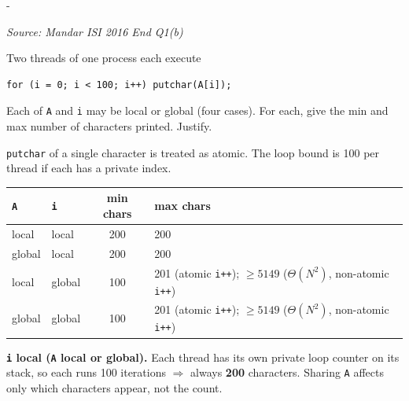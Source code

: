 \documentclass[11pt,a4paper]{article}
\makeatletter
\newcommand{\keepspace}[1]{\par\penalty-100\begingroup
  \setlength{\dimen@}{#1}\dimen@ii\pagegoal\advance\dimen@ii-\pagetotal
  \ifdim\dimen@>\dimen@ii\ifdim\dimen@ii>\z@\vfil\fi\break\fi\endgroup}
\newcounter{qn}[section]
\newenvironment{Qn}[4]{%
  \refstepcounter{qn}\keepspace{7\baselineskip}%
  \begin{tcolorbox}[qboxstyle, title={Q\thesection.\theqn\ \ [#1 \textbar\ #2]\ \ #4}]%
  {\footnotesize\color{g3}\textit{Source: #3}}\par\smallskip%
}{%
  \end{tcolorbox}%
}
\newenvironment{Sol}{%
  \begin{tcolorbox}[sboxstyle, title={Solution}]%
}{%
  \end{tcolorbox}\vspace{0.35em}%
}
\makeatother
\begin{document}
\begin{Qn}{Hard}{Lect 16}{Mandar ISI 2016 End Q1(b)}{Two threads, \texttt{putchar(A[i])}: four locality combinations}
Two threads of one process each execute

\begin{lstlisting}[numbers=none]
for (i = 0; i < 100; i++) putchar(A[i]);
\end{lstlisting}

Each of \texttt{A} and \texttt{i} may be local or global (four cases). For each, give the min and max number of characters printed. Justify.
\end{Qn}
\begin{Sol}
\texttt{putchar} of a single character is treated as atomic. The loop bound is 100 per thread if each has a private index.

\begin{center}
\small
\begin{tabularx}{\linewidth}{@{}l|l|c|X@{}}
\texttt{A} & \texttt{i} & min chars & max chars \\
\hline
local  & local  & 200 & 200 \\
global & local  & 200 & 200 \\
local  & global & 100 & 201 (atomic \texttt{i++}); $\ge 5149$ ($\Theta(N^2)$, non-atomic \texttt{i++}) \\
global & global & 100 & 201 (atomic \texttt{i++}); $\ge 5149$ ($\Theta(N^2)$, non-atomic \texttt{i++}) \\
\end{tabularx}
\end{center}

\textbf{\texttt{i} local (\texttt{A} local or global).} Each thread has its own private loop counter on its stack, so each runs 100 iterations $\Rightarrow$ always \textbf{200} characters. Sharing \texttt{A} affects only which characters appear, not the count.


\end{Sol}
\end{document}

